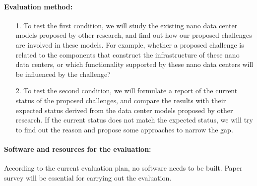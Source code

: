 \documentclass[sigchi-a, authorversion]{acmart}
\begin{document}
\paragraph{Evaluation method:} 
\begin{enumerate}
\item[1.] To test the first condition, 
we will study the existing nano data center models proposed by other research, 
and find out how our proposed challenges are involved in these models. 
For example, whether a proposed challenge is related to the components that construct the infrastructure of these nano data centers,
or which functionality supported by these nano data centers will be influenced by the challenge?
\item[2.] To test the second condition,
we will formulate a report of the current status of the proposed challenges,
and compare the results with their expected status derived from the data center models proposed by other research.
If the current status does not match the expected status,
we will try to find out the reason and propose some approaches to narrow the gap.
\end{enumerate}

\paragraph{Software and resources for the evaluation:}
According to the current evaluation plan, no software needs to be built. Paper survey will be essential for carrying out the evaluation.
\end{document}
